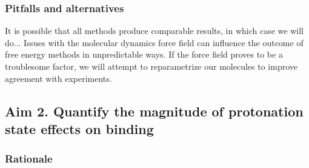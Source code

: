 \documentclass[10pt,final]{article}
\begin{document}
\subsubsection*{Pitfalls and alternatives}

It is possible that all methods produce comparable results, in which case we will do...  %
Issues with the molecular dynamics force field can influence the outcome of free energy methods in unpredictable ways. If the force field proves to be a troublesome factor, we will attempt to reparametrize our molecules to improve agreement with experiments. %

\subsection*{Aim 2. Quantify the magnitude of protonation state effects on binding}
\subsubsection*{Rationale}
\end{document}

